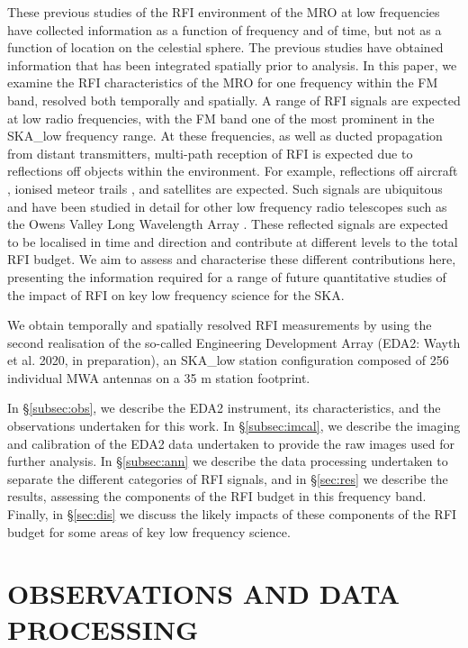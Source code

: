 These previous studies of the RFI environment of the MRO at low frequencies have collected information as a function of frequency and of time, but not as a function of location on the celestial sphere.  The previous studies have obtained information that has been integrated spatially prior to analysis.  In this paper, we examine the RFI characteristics of the MRO for one frequency within the FM band, resolved both temporally and spatially.  A range of RFI signals are expected at low radio frequencies, with the FM band one of the most prominent in the SKA\_low frequency range.  At these frequencies, as well as ducted propagation from distant transmitters, multi-path reception of RFI is expected due to reflections off objects within the environment.  For example, reflections off aircraft \citep{2020arXiv200407819W}, ionised meteor trails \citep{2018MNRAS.477.5167Z}, and satellites \citep{2020PASA...37...10P, 2018MNRAS.477.5167Z, Tingay2013OnFeasibility} are expected.  Such signals are ubiquitous and have been studied in detail for other low frequency radio telescopes such as the Owens Valley Long Wavelength Array \citep{https://doi.org/10.7907/25dp-j474}.  These reflected signals are expected to be localised in time and direction and contribute at different levels to the total RFI budget.  We aim to assess and characterise these different contributions here, presenting the information required for a range of future quantitative studies of the impact of RFI on key low frequency science for the SKA.

We obtain temporally and spatially resolved RFI measurements by using the second realisation of the so-called Engineering Development Array (EDA2: Wayth et al. 2020, in preparation), an SKA\_low station configuration composed of 256 individual MWA antennas on a 35 m station footprint.

In \S \ref{subsec:obs}, we describe the EDA2 instrument, its characteristics, and the observations undertaken for this work.  In \S \ref{subsec:imcal}, we describe the imaging and calibration of the EDA2 data undertaken to provide the raw images used for further analysis.  In \S \ref{subsec:ann} we describe the data processing undertaken to separate the different categories of RFI signals, and in \S \ref{sec:res} we describe the results, assessing the components of the RFI budget in this frequency band.  Finally, in \S \ref{sec:dis} we discuss the likely impacts of these components of the RFI budget for some areas of key low frequency science.

\section{OBSERVATIONS AND DATA PROCESSING}
\label{sec:obs}


